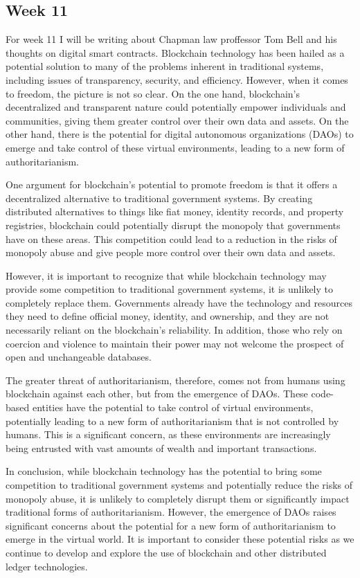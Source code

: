 \documentclass{article}
\theoremstyle{theorem}
\theoremstyle{definition}
\theoremstyle{remark}
\begin{document}
\subsection{Week 11}
For week 11 I will be writing about Chapman law proffessor Tom Bell and his thoughts on digital smart contracts. 
Blockchain technology has been hailed as a potential solution to many of the problems inherent in traditional systems, including issues of transparency, security, and efficiency. However, when it comes to freedom, the picture is not so clear. On the one hand, blockchain's decentralized and transparent nature could potentially empower individuals and communities, giving them greater control over their own data and assets. On the other hand, there is the potential for digital autonomous organizations (DAOs) to emerge and take control of these virtual environments, leading to a new form of authoritarianism.

One argument for blockchain's potential to promote freedom is that it offers a decentralized alternative to traditional government systems. By creating distributed alternatives to things like fiat money, identity records, and property registries, blockchain could potentially disrupt the monopoly that governments have on these areas. This competition could lead to a reduction in the risks of monopoly abuse and give people more control over their own data and assets.

However, it is important to recognize that while blockchain technology may provide some competition to traditional government systems, it is unlikely to completely replace them. Governments already have the technology and resources they need to define official money, identity, and ownership, and they are not necessarily reliant on the blockchain's reliability. In addition, those who rely on coercion and violence to maintain their power may not welcome the prospect of open and unchangeable databases.

The greater threat of authoritarianism, therefore, comes not from humans using blockchain against each other, but from the emergence of DAOs. These code-based entities have the potential to take control of virtual environments, potentially leading to a new form of authoritarianism that is not controlled by humans. This is a significant concern, as these environments are increasingly being entrusted with vast amounts of wealth and important transactions.

In conclusion, while blockchain technology has the potential to bring some competition to traditional government systems and potentially reduce the risks of monopoly abuse, it is unlikely to completely disrupt them or significantly impact traditional forms of authoritarianism. However, the emergence of DAOs raises significant concerns about the potential for a new form of authoritarianism to emerge in the virtual world. It is important to consider these potential risks as we continue to develop and explore the use of blockchain and other distributed ledger technologies.
\end{document}
